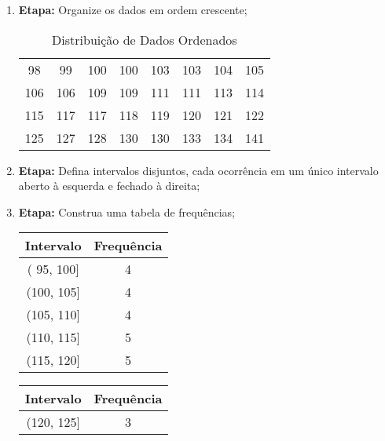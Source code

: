 \documentclass{article}
\begin{document}
                \begin{enumerate}
                    \item \textbf{Etapa:} Organize os dados em ordem crescente;
                        \begin{table}[H]
                            \centering
                            \begin{tabular}[]{cccccccc}\hline
                                98 &  99 & 100 & 100 & 103 & 103 & 104 & 105\\
                                106 & 106 & 109 & 109 & 111 & 111 & 113 & 114\\
                                115 & 117 & 117 & 118 & 119 & 120 & 121 & 122\\
                                125 & 127 & 128 & 130 & 130 & 133 & 134 & 141\\\hline
                            \end{tabular}
                            \caption{Distribuição de Dados Ordenados}\label{table:dataShort}
                        \end{table}
                    \item \textbf{Etapa:} Defina intervalos disjuntos, cada ocorrência em um único intervalo aberto à esquerda e fechado à direita;
                    \item \textbf{Etapa:} Construa uma tabela de frequências;
                        \begin{table}[H]
                            \centering
                            \begin{tabular}[]{c|c}\hline
                                Intervalo  & Frequência\\\hline
                                ( 95, 100] & 4\\
                                (100, 105] & 4\\
                                (105, 110] & 4\\
                                (110, 115] & 5\\
                                (115, 120] & 5\\\hline
                            \end{tabular}
                            \hspace{10mm}
                            \begin{tabular}[]{c|c}\hline
                                Intervalo  & Frequência\\\hline
                                (120, 125] & 3\\

\end{tabular}
\end{table}
\end{enumerate}
\end{document}
